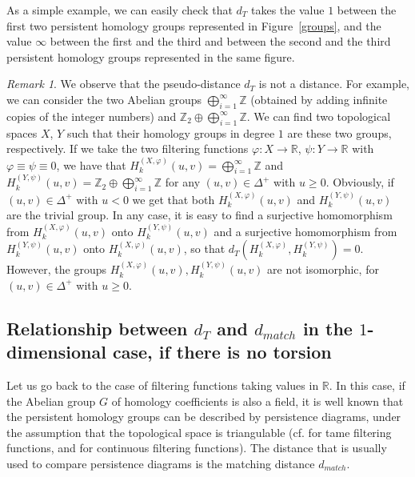 \documentclass{amsart}
\theoremstyle{definition}
\theoremstyle{remark}
\newtheorem{remark}[theorem]{Remark}
\newcommand{\R}{\mathbb{R}}
\numberwithin{equation}{section}
\begin{document}
As a simple example, we can easily check that $d_T$ takes the value $1$ between the first two persistent homology groups represented in Figure~\ref{groups}, and the value $\infty$ between the first and the third and between the second and the third persistent homology groups represented in the same figure.


\begin{remark}\label{rem_pd}
We observe that the pseudo-distance $d_T$ is not a distance. For example, we can consider the two Abelian groups $\bigoplus_{i=1}^\infty \mathbb{Z}$ (obtained by adding infinite copies of the integer numbers) and  $\mathbb{Z}_2\oplus\bigoplus_{i=1}^\infty \mathbb{Z}$. We can find two topological spaces $X$, $Y$ such that their homology groups in degree $1$ are these two groups, respectively. If we take the two filtering functions $\varphi:X\to\R$, $\psi:Y\to\R$ with $\varphi\equiv\psi\equiv 0$, we have that $H^{(X,\varphi)}_k(u,v)=\bigoplus_{i=1}^\infty \mathbb{Z}$ and $H^{(Y,\psi)}_k(u,v)= \mathbb{Z}_2\oplus\bigoplus_{i=1}^\infty \mathbb{Z}$ for any $(u,v)\in \Delta^+$ with $u\ge 0$. Obviously, if $(u,v)\in \Delta^+$ with $u< 0$ we get that both $H^{(X,\varphi)}_k(u,v)$ and $H^{(Y,\psi)}_k(u,v)$ are the trivial group. In any case, it is easy to find a surjective homomorphism from $ H^{(X,\varphi)}_k(u,v)$ onto $ H^{(Y,\psi)}_k(u,v)$ and a surjective homomorphism from $H^{(Y,\psi)}_k(u,v)$ onto $ H^{(X,\varphi)}_k(u,v)$, so that $d_T\left( H^{(X,\varphi)}_k, H^{(Y,\psi)}_k\right)=0$. However, the groups $H^{(X,\varphi)}_k(u,v), H^{(Y,\psi)}_k(u,v)$ are not isomorphic, for $(u,v)\in \Delta^+$ with $u\ge 0$.
\end{remark}

\subsection{Relationship between $d_T$ and $d_{match}$ in the $1$-dimensional case, if there is no torsion}

Let us go back to the case of filtering functions taking values in $\R$. In this case, if the Abelian group $G$ of homology coefficients is also a field, it is well known that
the persistent homology groups can be described by persistence diagrams, under the assumption that the topological space is triangulable (cf. \cite{CoEdHa07} for tame filtering functions, and \cite{CeDiFeFrLa09} for continuous filtering functions). The distance that is usually used to compare persistence diagrams is the matching distance $d_{match}$.
\end{document}
